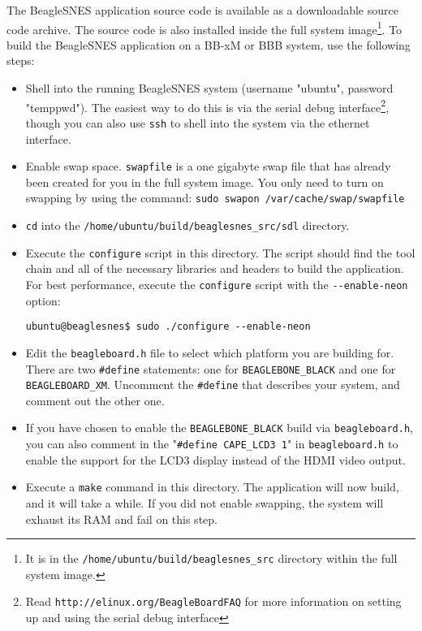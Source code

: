 The BeagleSNES application source code is available as a downloadable source code archive.  The source code is also installed inside the full system image\footnote{It is in the \texttt{/home/ubuntu/build/beaglesnes\_src} directory within the full system image.}.  To build the BeagleSNES application on a BB-xM or BBB system, use the following steps:

\begin{itemize}
\item Shell into the running BeagleSNES system (username "ubuntu", password "temppwd").  The easiest way to do this is via the serial debug interface\footnote{Read \texttt{http://elinux.org/BeagleBoardFAQ} for more information on setting up and using the serial debug interface}, though you can also use \texttt{ssh} to shell into the system via the ethernet interface.
\item Enable swap space.  \texttt{swapfile} is a one gigabyte swap file that has already been created for you in the full system image.  You only need to turn on swapping by using the command: \texttt{sudo swapon /var/cache/swap/swapfile}
\item \texttt{cd} into the \texttt{/home/ubuntu/build/beaglesnes\_src/sdl} directory.
\item Execute the \texttt{configure} script in this directory.  The script should find the tool chain and all of the necessary libraries and headers to build the application.  For best performance, execute the \texttt{configure} script with the \texttt{-{}-enable-neon} option:
\begin{commandBox}
\texttt{ubuntu@beaglesnes\$  sudo ./configure -{}-enable-neon}
\end{commandBox}
\item Edit the \texttt{beagleboard.h} file to select which platform you are building for.  There are two \texttt{\#define} statements: one for \texttt{BEAGLEBONE\_BLACK} and one for \texttt{BEAGLEBOARD\_XM}. Uncomment the \texttt{\#define} that describes your system, and comment out the other one.
\item If you have chosen to enable the \texttt{BEAGLEBONE\_BLACK} build via \texttt{beagleboard.h}, you can also comment in the "\texttt{\#define CAPE\_LCD3 1}" in \texttt{beagleboard.h} to enable the support for the LCD3 display instead of the HDMI video output.
\item Execute a \texttt{make} command in this directory.  The application will now build, and it will take a while.  If you did not enable swapping, the system will exhaust its RAM and fail on this step.

\end{itemize}
